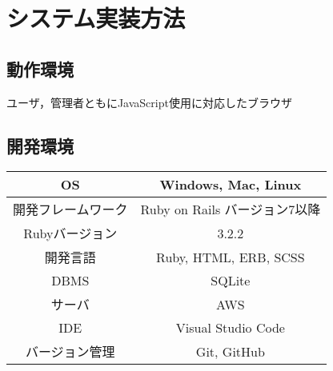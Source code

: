 \chapter{システム実装方法}
\section*{動作環境}
ユーザ，管理者ともにJavaScript使用に対応したブラウザ
\section*{開発環境}
\begin{tabular}{|c|c|} \hline
   OS & Windows, Mac, Linux\\  \hline
   開発フレームワーク & Ruby on Rails  バージョン7以降 \\ \hline
   Rubyバージョン & 3.2.2\\  \hline
   開発言語 & Ruby, HTML, ERB, SCSS\\ \hline
   DBMS & SQLite \\ \hline
   サーバ & AWS \\ \hline
   IDE & Visual Studio Code \\ \hline
   バージョン管理 & Git, GitHub \\ \hline
 \end{tabular}
